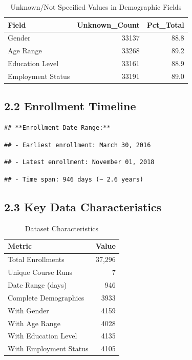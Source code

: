 \documentclass[
]{article}
\begin{document}
\begin{longtable}[t]{lrr}
\caption{\label{tab:unknown-values}Unknown/Not Specified Values in Demographic Fields}\\
\toprule
Field & Unknown\_Count & Pct\_Total\\
\midrule
Gender & 33137 & 88.8\\
Age Range & 33268 & 89.2\\
Education Level & 33161 & 88.9\\
Employment Status & 33191 & 89.0\\
\bottomrule
\end{longtable}

\subsection{2.2 Enrollment Timeline}\label{enrollment-timeline}

\begin{verbatim}
## **Enrollment Date Range:**
\end{verbatim}

\begin{verbatim}
## - Earliest enrollment: March 30, 2016
\end{verbatim}

\begin{verbatim}
## - Latest enrollment: November 01, 2018
\end{verbatim}

\begin{verbatim}
## - Time span: 946 days (~ 2.6 years)
\end{verbatim}

\subsection{2.3 Key Data
Characteristics}\label{key-data-characteristics}

\begin{longtable}[t]{lr}
\caption{\label{tab:data-characteristics}Dataset Characteristics}\\
\toprule
Metric & Value\\
\midrule
Total Enrollments & 37,296\\
Unique Course Runs & 7\\
Date Range (days) & 946\\
Complete Demographics & 3933\\
With Gender & 4159\\
\addlinespace
With Age Range & 4028\\
With Education Level & 4135\\
With Employment Status & 4105\\
\bottomrule
\end{longtable}
\end{document}
